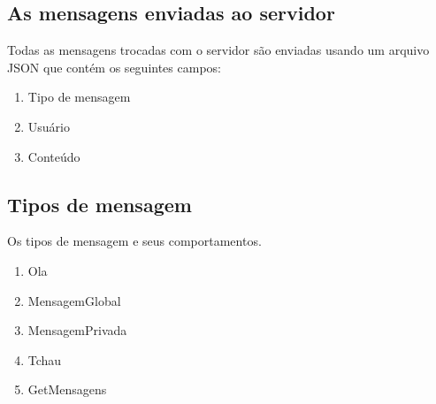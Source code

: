 \documentclass{article}
\begin{document}
{{        \subsection{As mensagens enviadas ao servidor}
        {
            Todas as mensagens trocadas com o servidor são enviadas usando um arquivo JSON que contém os seguintes campos:
            \begin{enumerate}
                \item Tipo de mensagem
                \item Usuário
                \item Conteúdo
            \end{enumerate}
        }
        \subsection{Tipos de mensagem}
        {
            Os tipos de mensagem e seus comportamentos.
            \\ \begin{enumerate}
                \item Ola
                \item MensagemGlobal
                \item MensagemPrivada
                \item Tchau
                \item GetMensagens
            \end{enumerate}
        }
        
        
}}
\end{document}

